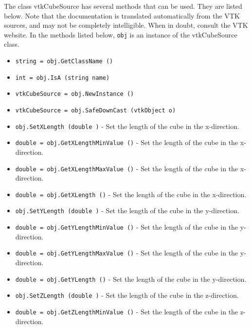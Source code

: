 The class vtkCubeSource has several methods that can be used.
  They are listed below.
Note that the documentation is translated automatically from the VTK sources,
and may not be completely intelligible.  When in doubt, consult the VTK website.
In the methods listed below, \verb|obj| is an instance of the vtkCubeSource class.
\begin{itemize}
\item  \verb|string = obj.GetClassName ()|

\item  \verb|int = obj.IsA (string name)|

\item  \verb|vtkCubeSource = obj.NewInstance ()|

\item  \verb|vtkCubeSource = obj.SafeDownCast (vtkObject o)|

\item  \verb|obj.SetXLength (double )| -  Set the length of the cube in the x-direction.

\item  \verb|double = obj.GetXLengthMinValue ()| -  Set the length of the cube in the x-direction.

\item  \verb|double = obj.GetXLengthMaxValue ()| -  Set the length of the cube in the x-direction.

\item  \verb|double = obj.GetXLength ()| -  Set the length of the cube in the x-direction.

\item  \verb|obj.SetYLength (double )| -  Set the length of the cube in the y-direction.

\item  \verb|double = obj.GetYLengthMinValue ()| -  Set the length of the cube in the y-direction.

\item  \verb|double = obj.GetYLengthMaxValue ()| -  Set the length of the cube in the y-direction.

\item  \verb|double = obj.GetYLength ()| -  Set the length of the cube in the y-direction.

\item  \verb|obj.SetZLength (double )| -  Set the length of the cube in the z-direction.

\item  \verb|double = obj.GetZLengthMinValue ()| -  Set the length of the cube in the z-direction.


\end{itemize}
